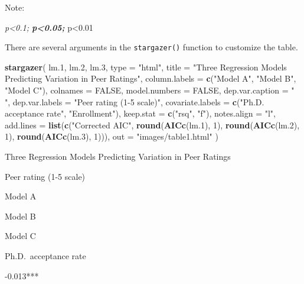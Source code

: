 \documentclass[]{book}
\newenvironment{Shaded}{\begin{snugshade}}{\end{snugshade}}
\newcommand{\DataTypeTok}[1]{\textcolor[rgb]{0.13,0.29,0.53}{#1}}
\newcommand{\DecValTok}[1]{\textcolor[rgb]{0.00,0.00,0.81}{#1}}
\newcommand{\FloatTok}[1]{\textcolor[rgb]{0.00,0.00,0.81}{#1}}
\newcommand{\KeywordTok}[1]{\textcolor[rgb]{0.13,0.29,0.53}{\textbf{#1}}}
\newcommand{\NormalTok}[1]{#1}
\newcommand{\OtherTok}[1]{\textcolor[rgb]{0.56,0.35,0.01}{#1}}
\newcommand{\StringTok}[1]{\textcolor[rgb]{0.31,0.60,0.02}{#1}}
\begin{document}
Note:

\emph{p\textless{}0.1; \textbf{p\textless{}0.05; }}p\textless{}0.01

There are several arguments in the \texttt{stargazer()} function to customize the table.

\begin{Shaded}
\begin{Highlighting}[]
\KeywordTok{stargazer}\NormalTok{(}
\NormalTok{  lm}\FloatTok{.1}\NormalTok{, lm}\FloatTok{.2}\NormalTok{, lm}\FloatTok{.3}\NormalTok{,}
  \DataTypeTok{type =} \StringTok{"html"}\NormalTok{,}
  \DataTypeTok{title =} \StringTok{"Three Regression Models Predicting Variation in Peer Ratings"}\NormalTok{,}
  \DataTypeTok{column.labels =} \KeywordTok{c}\NormalTok{(}\StringTok{"Model A"}\NormalTok{, }\StringTok{"Model B"}\NormalTok{, }\StringTok{"Model C"}\NormalTok{),}
  \DataTypeTok{colnames =} \OtherTok{FALSE}\NormalTok{,}
  \DataTypeTok{model.numbers =} \OtherTok{FALSE}\NormalTok{,}
  \DataTypeTok{dep.var.caption =} \StringTok{" "}\NormalTok{,}
  \DataTypeTok{dep.var.labels =} \StringTok{"Peer rating (1-5 scale)"}\NormalTok{,}
  \DataTypeTok{covariate.labels =} \KeywordTok{c}\NormalTok{(}\StringTok{"Ph.D. acceptance rate"}\NormalTok{, }\StringTok{"Enrollment"}\NormalTok{),}
  \DataTypeTok{keep.stat =} \KeywordTok{c}\NormalTok{(}\StringTok{"rsq"}\NormalTok{, }\StringTok{"f"}\NormalTok{),}
  \DataTypeTok{notes.align =} \StringTok{"l"}\NormalTok{,}
  \DataTypeTok{add.lines =} \KeywordTok{list}\NormalTok{(}\KeywordTok{c}\NormalTok{(}\StringTok{"Corrected AIC"}\NormalTok{, }\KeywordTok{round}\NormalTok{(}\KeywordTok{AICc}\NormalTok{(lm}\FloatTok{.1}\NormalTok{), }\DecValTok{1}\NormalTok{), }\KeywordTok{round}\NormalTok{(}\KeywordTok{AICc}\NormalTok{(lm}\FloatTok{.2}\NormalTok{), }\DecValTok{1}\NormalTok{), }\KeywordTok{round}\NormalTok{(}\KeywordTok{AICc}\NormalTok{(lm}\FloatTok{.3}\NormalTok{), }\DecValTok{1}\NormalTok{))),}
  \DataTypeTok{out =} \StringTok{"images/table1.html"}
\NormalTok{  )}
\end{Highlighting}
\end{Shaded}

Three Regression Models Predicting Variation in Peer Ratings

Peer rating (1-5 scale)

Model A

Model B

Model C

Ph.D.~acceptance rate

-0.013***
\end{document}
